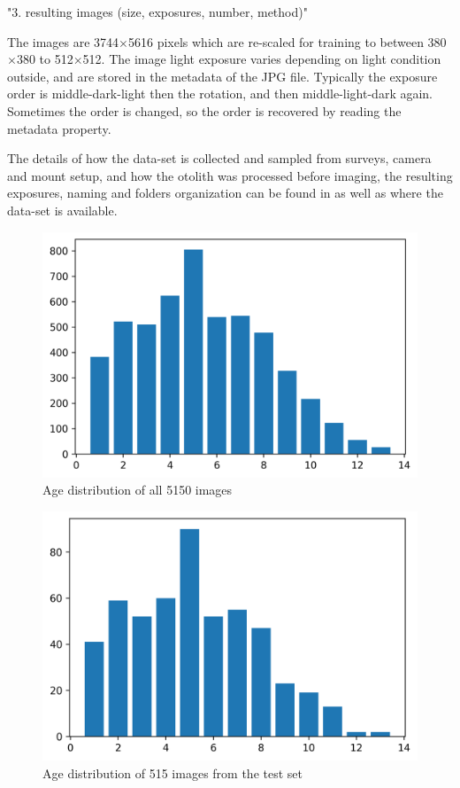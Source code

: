 \documentclass[10pt,letterpaper]{article}
\begin{document}
"3. resulting images (size, exposures, number, method)" 

The images are 3744$\times$5616 pixels which are re-scaled for training to between 380$\times$380 to 512$\times$512. The image light exposure varies depending on light condition outside, and are stored in the metadata of the JPG file. Typically the exposure order is middle-dark-light then the rotation, and then middle-light-dark again. 
Sometimes the order is changed, so the order is recovered by reading the metadata property.

The details of how the data-set is collected and sampled from surveys, camera and mount 
setup, and how the otolith was processed before imaging, the resulting exposures, naming and
folders organization can be found in \citep{codOtolithsMyers} as well as where the data-set is available.

\begin{figure}[h!]
  \centering
  \includegraphics[scale=0.60]{distribution/age_distribution.png}
  \caption{Age distribution of all 5150 images}
\end{figure}

\begin{figure}[h!]
  \centering
  \includegraphics[scale=0.60]{distribution/age_distribution_test.png}
  \caption{Age distribution of 515 images from the test set}
\end{figure}
\end{document}
